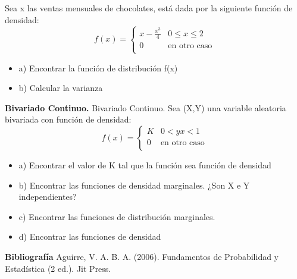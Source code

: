 \documentclass{oxmathproblems}
\begin{document}
\begin{questions}
\miquestion Sea x las ventas mensuales de chocolates, está dada por la siguiente función de densidad: 
\[ 
f(x) = 
     \begin{cases}
       x- \frac{x^3}{4}  & 0  \leq x  \leq 2 \\
       0 & \text{en otro caso} \\
     \end{cases}
\]
$$$$
\begin{itemize}
\item  a) Encontrar la función de distribución f(x)  
\item  b) Calcular la varianza
\end{itemize}

\miquestion \textbf {Bivariado Continuo. }{Bivariado Continuo. } Sea (X,Y) una variable aleatoria bivariada con función de densidad: 
\[ 
f(x) = 
     \begin{cases}
        K  & 0  < {y}   
        {x} < 1 \\
       0 & \text{en otro caso} \\
     \end{cases}
\]

\begin{itemize}
\item  a) Encontrar el valor de K tal que la función sea función de densidad  
\item  b) Encontrar las funciones de densidad marginales. ¿Son X e Y independientes?
\item  c) Encontrar las funciones de distribución marginales. 
\item  d) Encontrar las funciones de densidad 
\end{itemize}
\end{questions}



\textbf{Bibliografía}
Aguirre, V. A. B. A. (2006). Fundamentos de Probabilidad y Estadística (2 ed.). Jit Press.
\end{document}
